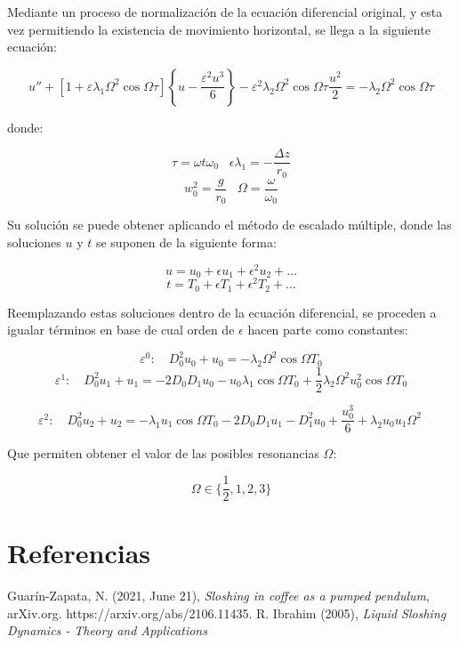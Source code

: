 \documentclass{article}
\begin{document}
Mediante un proceso de normalización de la ecuación diferencial original, y esta vez permitiendo la existencia de movimiento horizontal, se llega a la siguiente ecuación:

$$
u'' + \left[ 1 + \varepsilon \lambda_1 \Omega^2 \cos \Omega \tau \right] \left\{ u - \frac{\varepsilon^2 u^3}{6} \right\} - \varepsilon^2 \lambda_2 \Omega^2 \cos \Omega \tau \frac{u^2}{2} = - \lambda_2 \Omega^2 \cos \Omega \tau$$

donde:

$$ \tau = \omega t\omega_0 \;\;\; \epsilon\lambda_1 = -\frac{\Delta z}{r_0}$$
$$  w_0^2= \frac{g}{r_0} \;\;\; \Omega = \frac{\omega}{\omega_0}$$

Su solución se puede obtener aplicando el método de escalado múltiple, donde las soluciones $u$ y $t$ se suponen de la siguiente forma:

$$
u = u_0 + \epsilon u_1 + \epsilon^2u_2 +\dots
$$
$$
t = T_0 + \epsilon T_1 + \epsilon^2T_2 + \dots
$$

Reemplazando estas soluciones dentro de la ecuación diferencial, se proceden a igualar términos en base de cual orden de $\epsilon$ hacen parte como constantes:

$$
\varepsilon^0: \quad D_0^2 u_0 + u_0 = -\lambda_2 \Omega^2 \cos \Omega T_0
$$
$$
\varepsilon^1: \quad D_0^2 u_1 + u_1 = -2 D_0 D_1 u_0 - u_0 \lambda_1 \cos \Omega T_0 + \frac{1}{2} \lambda_2 \Omega^2 u_0^2 \cos \Omega T_0
$$

$$
\varepsilon^2: \quad D_0^2 u_2 + u_2 = -\lambda_1 u_1 \cos \Omega T_0 - 2 D_0 D_1 u_1 - D_1^2 u_0 + \frac{u_0^3}{6} + \lambda_2 u_0 u_1 \Omega^2 \
$$

Que permiten obtener el valor de las posibles resonancias $\Omega$:


$$
\Omega \in \{ \frac{1}{2}, 1, 2, 3\}
$$


\section{Referencias}
\begingroup
\renewcommand{\section}[2]{}
\begin{thebibliography}{0}
\setlength{\parskip}{0mm}
\setlength{\itemsep}{-0.3mm}
\small

 Guarín-Zapata, N. (2021, June 21), \textit{ Sloshing in coffee as a pumped pendulum},  
arXiv.org. https://arxiv.org/abs/2106.11435.
R. Ibrahim (2005), \textit{Liquid Sloshing Dynamics - Theory and Applications}

\end{thebibliography}
\end{document}
